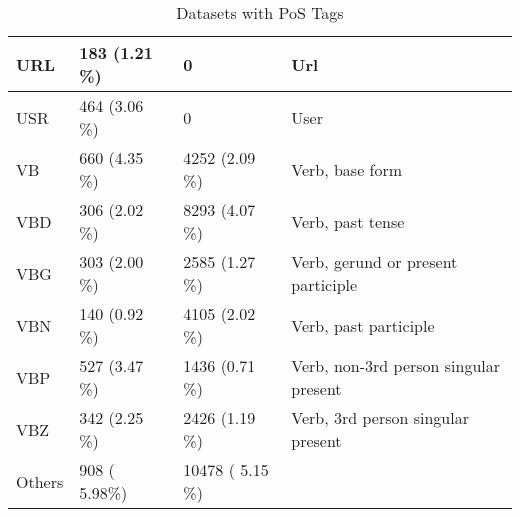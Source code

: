 \begin{table}[H]
\begin{tabular}{|l|l|l|l|}
URL & 183 (1.21 \%) & 0 & Url\\ \hline
USR & 464 (3.06 \%) & 0 & User\\ \hline
VB & 660 (4.35 \%) & 4252 (2.09 \%) & Verb, base form \\ \hline
VBD & 306 (2.02 \%) & 8293 (4.07 \%) & Verb, past tense \\ \hline
VBG & 303 (2.00 \%) & 2585 (1.27 \%) & Verb, gerund or present participle \\ \hline
VBN & 140 (0.92 \%) & 4105 (2.02 \%) & Verb, past participle \\ \hline
VBP & 527 (3.47 \%) & 1436 (0.71 \%) & Verb, non-3rd person singular present \\ \hline
VBZ & 342 (2.25 \%) & 2426 (1.19 \%) & Verb, 3rd person singular present \\ \hline
Others & 908 ( 5.98\%) & 10478 ( 5.15 \%) & \\ \hline
\end{tabular}
\caption[Datasets with PoS Tags]{Datasets  with PoS Tags}
\label{tab:data-pos}
\end{table}

